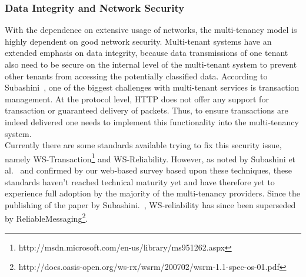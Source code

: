\subsubsection{Data Integrity and Network Security}
With the dependence on extensive usage of networks, the multi-tenancy model is highly dependent on good network security.  
Multi-tenant systems have an extended emphasis on data integrity, because data transmissions of one tenant also need to be secure on the internal level of the multi-tenant system to prevent other tenants from accessing the potentially classified data.
According to Subashini~\cite{Subashini2011Security}, one of the biggest challenges with multi-tenant services is transaction management. 
At the protocol level, HTTP does not offer any support for transaction or guaranteed delivery of packets. 
Thus, to ensure transactions are indeed delivered one needs to implement this functionality into the multi-tenancy system.\\

Currently there are some standards available trying to fix this security issue, namely WS-Transaction\footnote{http://msdn.microsoft.com/en-us/library/ms951262.aspx} and WS-Reliability.
However, as noted by Subashini et al.~\cite{Subashini2011Security} and confirmed by our web-based survey based upon these techniques, these standards haven’t reached technical maturity yet and have therefore yet to experience full adoption by the majority of the multi-tenancy providers.
Since the publishing of the paper by Subashini.~\cite{Subashini2011Security}, WS-reliability has since been superseded by ReliableMessaging\footnote{http://docs.oasis-open.org/ws-rx/wsrm/200702/wsrm-1.1-spec-os-01.pdf}.

